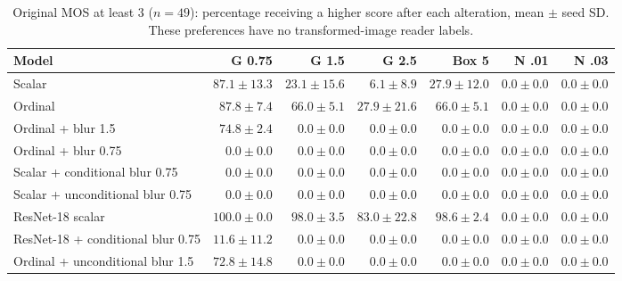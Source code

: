 \begin{table}[ht]\centering\scriptsize
\caption{Original MOS at least 3 ($n=49$): percentage receiving a higher score after each alteration, mean $\pm$ seed SD. These preferences have no transformed-image reader labels.}
\begin{tabular}{lrrrrrr}\toprule Model & G 0.75 & G 1.5 & G 2.5 & Box 5 & N .01 & N .03 \\ \midrule
Scalar & $87.1\pm13.3$ & $23.1\pm15.6$ & $6.1\pm8.9$ & $27.9\pm12.0$ & $0.0\pm0.0$ & $0.0\pm0.0$ \\
Ordinal & $87.8\pm7.4$ & $66.0\pm5.1$ & $27.9\pm21.6$ & $66.0\pm5.1$ & $0.0\pm0.0$ & $0.0\pm0.0$ \\
Ordinal + blur 1.5 & $74.8\pm2.4$ & $0.0\pm0.0$ & $0.0\pm0.0$ & $0.0\pm0.0$ & $0.0\pm0.0$ & $0.0\pm0.0$ \\
Ordinal + blur 0.75 & $0.0\pm0.0$ & $0.0\pm0.0$ & $0.0\pm0.0$ & $0.0\pm0.0$ & $0.0\pm0.0$ & $0.0\pm0.0$ \\
Scalar + conditional blur 0.75 & $0.0\pm0.0$ & $0.0\pm0.0$ & $0.0\pm0.0$ & $0.0\pm0.0$ & $0.0\pm0.0$ & $0.0\pm0.0$ \\
Scalar + unconditional blur 0.75 & $0.0\pm0.0$ & $0.0\pm0.0$ & $0.0\pm0.0$ & $0.0\pm0.0$ & $0.0\pm0.0$ & $0.0\pm0.0$ \\
ResNet-18 scalar & $100.0\pm0.0$ & $98.0\pm3.5$ & $83.0\pm22.8$ & $98.6\pm2.4$ & $0.0\pm0.0$ & $0.0\pm0.0$ \\
ResNet-18 + conditional blur 0.75 & $11.6\pm11.2$ & $0.0\pm0.0$ & $0.0\pm0.0$ & $0.0\pm0.0$ & $0.0\pm0.0$ & $0.0\pm0.0$ \\
Ordinal + unconditional blur 1.5 & $72.8\pm14.8$ & $0.0\pm0.0$ & $0.0\pm0.0$ & $0.0\pm0.0$ & $0.0\pm0.0$ & $0.0\pm0.0$ \\
\bottomrule\end{tabular}\end{table}
